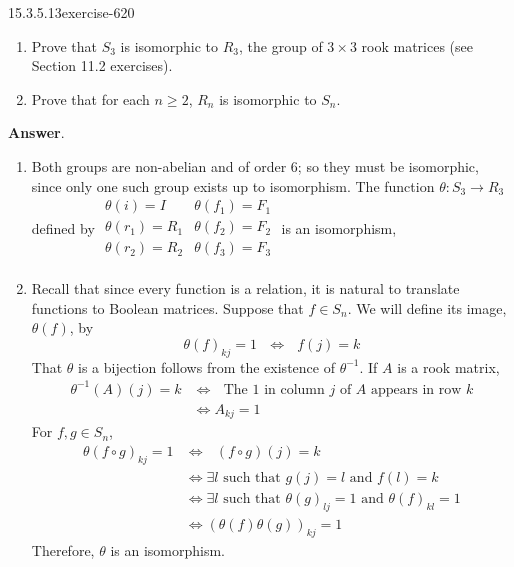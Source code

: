\documentclass[twoside,10pt,]{book}
\numberwithin{equation}{section}
\begin{document}
\begin{divisionsolution}{15.3.5.13}{}{exercise-620}%
\hypertarget{p-5522}{}%
\leavevmode%
\begin{enumerate}[label=(\alph*)]
\item\hypertarget{li-2447}{}\hypertarget{p-5523}{}%
Prove that \(S_3\) is isomorphic to \(R_3\),  the group of \(3 \times 3\) rook matrices (see Section 11.2 exercises).%
\item\hypertarget{li-2448}{}\hypertarget{p-5524}{}%
Prove that for each \(n \geq  2\), \(R_n\) is isomorphic to \(S_n\).%
\end{enumerate}
%
\par\smallskip%
\noindent\textbf{Answer}.\quad%
\hypertarget{p-5525}{}%
\leavevmode%
\begin{enumerate}[label=(\alph*)]
\item\hypertarget{li-2449}{}\hypertarget{p-5526}{}%
Both groups are non-abelian and of order 6; so they must be isomorphic, since only one such group exists up to isomorphism. The function \(\theta:S_3\to R_3\) defined by \(\begin{array}{cc}
\theta(i)=I & \theta\left(f_1\right)=F_1 \\
\theta\left(r_1\right)=R_1 & \theta\left(f_2\right)=F_2 \\
\theta\left(r_2\right)=R_2 & \theta\left(f_3\right)=F_3 \\
\end{array}\) is an isomorphism,%
\item\hypertarget{li-2450}{}\hypertarget{p-5527}{}%
Recall that since every function is a relation, it is natural to translate functions to Boolean matrices. Suppose that \(f\in S_n\). We will define its image, \(\theta(f)\), by%
\begin{equation*}
\theta(f)_{kj}=1\textrm{    }\Leftrightarrow \textrm{      }f(j)=k
\end{equation*}
That \(\theta\) is a bijection follows from the existence of \(\theta^{-1}\).   If \(A\) is a rook matrix,%
\begin{equation*}
\begin{split}
\theta^{-1}(A)(j)=k &\Leftrightarrow \textrm{ }\textrm{The } 1
\textrm{ in} \textrm{ column } j \textrm{ of } A \textrm{ appears} \textrm{ in} \textrm{ row } k \\
&\Leftrightarrow A_{kj}=1
\end{split}
\end{equation*}
For \(f,g\in  S_n\),%
\begin{equation*}
\begin{split}
\theta(f\circ g)_{kj}= 1 & \Leftrightarrow \textrm{ }(f \circ g)(j)=k\\
& \Leftrightarrow \exists  l\textrm{ such that }g(j)=l \textrm{ and } f(l)=k\\
& \Leftrightarrow \exists  l\textrm{ such that } \theta(g)_{lj}=1\textrm{ and }\textrm{}\theta(f)_{kl}=1\\
& \Leftrightarrow (\theta(f)\theta(g))_{kj}=1
\end{split}
\end{equation*}
Therefore,  \(\theta\) is an isomorphism.%
\end{enumerate}
%
\end{divisionsolution}%
\end{document}
